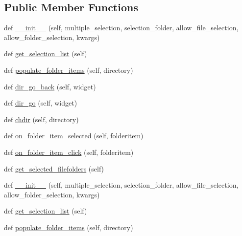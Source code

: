 \subsection*{Public Member Functions}
\begin{DoxyCompactItemize}
\item 
def \hyperlink{classremi_1_1gui_1_1FileFolderNavigator_a4686cb9331de748dc868b41ae81177f2}{\+\_\+\+\_\+init\+\_\+\+\_\+} (self, multiple\+\_\+selection, selection\+\_\+folder, allow\+\_\+file\+\_\+selection, allow\+\_\+folder\+\_\+selection, kwargs)
\item 
def \hyperlink{classremi_1_1gui_1_1FileFolderNavigator_a3996d5d90e883fb51744fd09948a2186}{get\+\_\+selection\+\_\+list} (self)
\item 
def \hyperlink{classremi_1_1gui_1_1FileFolderNavigator_a6bb12a130335b050647c24017a6055ba}{populate\+\_\+folder\+\_\+items} (self, directory)
\item 
def \hyperlink{classremi_1_1gui_1_1FileFolderNavigator_a5f64299c264af76267546db5296e5940}{dir\+\_\+go\+\_\+back} (self, widget)
\item 
def \hyperlink{classremi_1_1gui_1_1FileFolderNavigator_a7c1e11569c677f06a30fe065efff9b0f}{dir\+\_\+go} (self, widget)
\item 
def \hyperlink{classremi_1_1gui_1_1FileFolderNavigator_a68e64ee0d851e42e48e439932d6bd11b}{chdir} (self, directory)
\item 
def \hyperlink{classremi_1_1gui_1_1FileFolderNavigator_a11d7c3e56019d6caada880c1304170dc}{on\+\_\+folder\+\_\+item\+\_\+selected} (self, folderitem)
\item 
def \hyperlink{classremi_1_1gui_1_1FileFolderNavigator_a302e4113c2b897bbf0670dba485e6be9}{on\+\_\+folder\+\_\+item\+\_\+click} (self, folderitem)
\item 
def \hyperlink{classremi_1_1gui_1_1FileFolderNavigator_af2515489544b9461352a6901a872b695}{get\+\_\+selected\+\_\+filefolders} (self)
\item 
def \hyperlink{classremi_1_1gui_1_1FileFolderNavigator_a4686cb9331de748dc868b41ae81177f2}{\+\_\+\+\_\+init\+\_\+\+\_\+} (self, multiple\+\_\+selection, selection\+\_\+folder, allow\+\_\+file\+\_\+selection, allow\+\_\+folder\+\_\+selection, kwargs)
\item 
def \hyperlink{classremi_1_1gui_1_1FileFolderNavigator_a3996d5d90e883fb51744fd09948a2186}{get\+\_\+selection\+\_\+list} (self)
\item 
def \hyperlink{classremi_1_1gui_1_1FileFolderNavigator_a6bb12a130335b050647c24017a6055ba}{populate\+\_\+folder\+\_\+items} (self, directory)

\end{DoxyCompactItemize}

